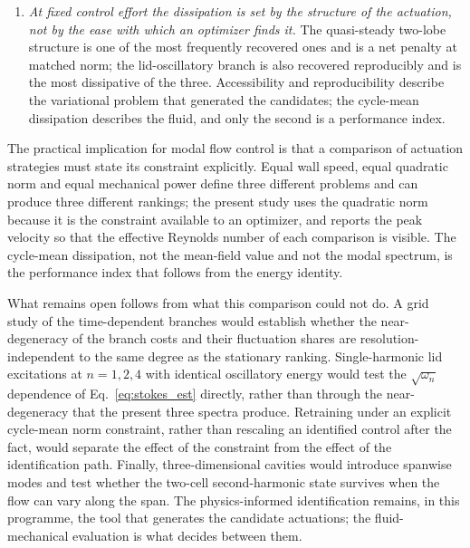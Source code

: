 \documentclass[11pt,a4paper]{article}
\begin{document}
\begin{enumerate}
the quasi-steady branch only $1.8\%$. The three branches nevertheless dissipate
within $21\%$ and $23\%$ of one another ($1.44$, $1.19$ and
$1.17\times10^{-2}$ at a common actuation norm of $0.25$): the oscillatory branch
is the most expensive not by a wide margin but by a modest factor of $1.2$, and the
quasi-steady and mixed responses are nearly equal, differing by $2.1\%$ at
$N=256$ and by $0.5\%$ at $N=512$. The
second-Stokes estimate of Sec.~\ref{sec:scaling} reproduces the fluctuating
dissipation of the lid-oscillatory and mixed branches ($B_2$ and $B_3$) to within
approximately $5\%$ and $2\%$ from the imposed lid
signal alone, and the Reynolds-stress forcing of
Sec.~\ref{sec:topology} is spatially consistent with a steady-streaming mechanism,
although a closed mean-vorticity budget has not yet been established.
\item \emph{At fixed control effort the dissipation is set by the structure of the
actuation, not by the ease with which an optimizer finds it.} The quasi-steady
two-lobe structure is one of the most frequently recovered ones and is a net penalty at
matched norm; the lid-oscillatory branch is also recovered reproducibly and is the
most dissipative of the three. Accessibility and reproducibility describe the
variational problem that generated the candidates; the cycle-mean dissipation
describes the fluid, and only the second is a performance index.
\end{enumerate}

The practical implication for modal flow control is that a comparison of actuation
strategies must state its constraint explicitly. Equal wall speed, equal quadratic
norm and equal mechanical power define three different problems and can produce
three different rankings; the present study uses the quadratic norm because it is
the constraint available to an optimizer, and reports the peak velocity so that
the effective Reynolds number of each comparison is visible. The cycle-mean
dissipation, not the mean-field value and not the modal spectrum, is the
performance index that follows from the energy identity.

What remains open follows from what this comparison could not do. A grid study of the
time-dependent branches
would establish whether the near-degeneracy of the branch costs and their
fluctuation shares are resolution-independent to the same degree as the stationary
ranking. Single-harmonic lid excitations at $n=1,2,4$ with identical oscillatory
energy would test the $\sqrt{\omega_n}$ dependence of Eq.~\eqref{eq:stokes_est}
directly, rather than through the near-degeneracy that the present three spectra
produce. Retraining under an explicit
cycle-mean norm constraint, rather than rescaling an identified control after the
fact, would separate the effect of the constraint from the effect of the
identification path. Finally, three-dimensional cavities would introduce spanwise
modes and test whether the two-cell second-harmonic state survives when the flow
can vary along the span. The physics-informed identification remains, in this
programme, the tool that generates the candidate actuations; the fluid-mechanical
evaluation is what decides between them.
\end{document}
